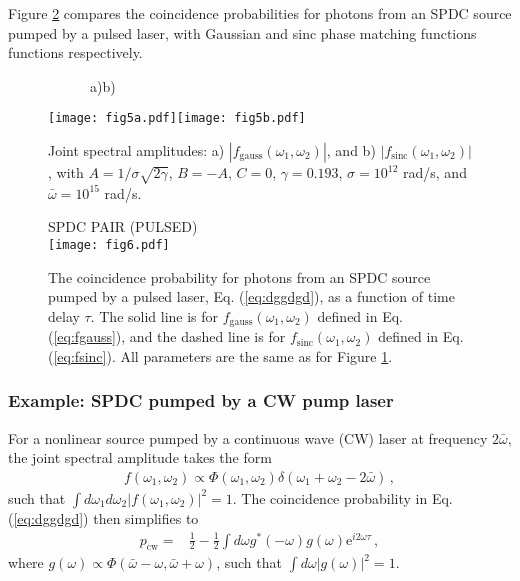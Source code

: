 \documentclass[12pt]{article}
\newcommand{\ee}[1] {\mathrm{e}^{#1}}
\begin{document}
Figure \ref{fig:ent} compares the coincidence probabilities for photons from an SPDC source pumped by a pulsed laser, with Gaussian and sinc phase matching functions functions respectively. 

\begin{figure}[t]
~~~~~~a)\hspace{7.5cm}b)
\vspace{-1.3cm}
\begin{center}
\texttt{[image: fig5a.pdf]}\hspace{1cm}\texttt{[image: fig5b.pdf]}
\caption{ Joint spectral amplitudes: a) $|f_{\mathrm{gauss}}(\omega_1,\omega_2)|$, and b) $|f_{\mathrm{sinc}}(\omega_1,\omega_2)|$, with $A=1/\sigma\sqrt{2\gamma}$, $B=-A$,  $C=0$, $\gamma=0.193$, $\sigma=10^{12}$ rad/s, and $\bar\omega=10^{15}$ rad/s. }
\label{fig:jsa}
\end{center}
\end{figure}
\begin{figure}[h!]
\begin{center}
SPDC PAIR (PULSED)\\
\texttt{[image: fig6.pdf]}
\caption{The coincidence probability for photons from an SPDC source pumped by a pulsed laser, Eq. (\ref{eq:dggdgd}), as a function of time delay $\tau$. The solid line is for $f_{\mathrm{gauss}}(\omega_1,\omega_2)$ defined in Eq.  (\ref{eq:fgauss}), and the dashed line is for $f_{\mathrm{sinc}}(\omega_1,\omega_2)$ defined in Eq.  (\ref{eq:fsinc}). All parameters are the same as for Figure \ref{fig:jsa}.}
\label{fig:ent}
\end{center}
\end{figure}

\subsubsection{Example: SPDC pumped by a CW pump laser}

For a nonlinear source pumped by a continuous wave (CW) laser at frequency $2\bar\omega$, the joint spectral amplitude takes the form 
\begin{align}
f(\omega_1,\omega_2)\propto \Phi(\omega_1,\omega_2)\delta(\omega_1+\omega_2-2\bar\omega)\,,
\end{align}
such that $\int d\omega_1 d\omega_2|f(\omega_1,\omega_2)|^2=1$. The coincidence probability in Eq. (\ref{eq:dggdgd}) then simplifies to 
\begin{align}\label{eq:cwprob}
p_{\mathrm{cw}}={}&\frac{1}{2}-\frac{1}{2}\int d\omega g^*(-\omega)g(\omega)\ee{i2\omega \tau} \,,
\end{align}
where  $g(\omega)\propto\Phi(\bar\omega-\omega,\bar\omega+\omega)$, such that $\int d\omega|g(\omega)|^2=1$. 
\end{document}
